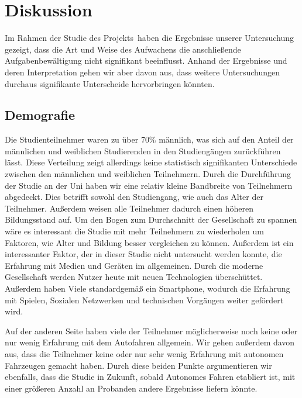 \chapter{Diskussion}

Im Rahmen der Studie des Projekts \projectName \,haben die Ergebnisse unserer Untersuchung gezeigt, dass die Art und Weise des Aufwachens die anschließende Aufgabenbewältigung nicht signifikant beeinflusst.
Anhand der Ergebnisse und deren Interpretation gehen wir aber davon aus, dass weitere Untersuchungen durchaus signifikante Unterscheide hervorbringen könnten.

\section{Demografie}

Die Studienteilnehmer waren zu über 70\% männlich, was sich auf den Anteil der männlichen und weiblichen Studierenden in den Studiengängen zurückführen lässt. Diese Verteilung zeigt allerdings keine statistisch signifikanten Unterschiede zwischen den männlichen und weiblichen Teilnehmern.
Durch die Durchführung der Studie an der Uni haben wir eine relativ kleine Bandbreite von Teilnehmern abgedeckt. Dies betrifft sowohl den Studiengang, wie auch das Alter der Teilnehmer. Außerdem weisen alle Teilnehmer dadurch einen höheren Bildungsstand auf. 
Um den Bogen zum Durchschnitt der Gesellschaft zu spannen wäre es interessant die Studie mit mehr Teilnehmern zu wiederholen um Faktoren, wie Alter und Bildung besser vergleichen zu können.
Außerdem ist ein interessanter Faktor, der in dieser Studie nicht untersucht werden konnte, die Erfahrung mit Medien und Geräten im allgemeinen. 
Durch die moderne Gesellschaft werden Nutzer heute mit neuen Technologien überschüttet. Außerdem haben Viele standardgemäß ein Smartphone, wodurch die Erfahrung mit Spielen, Sozialen Netzwerken und technischen Vorgängen weiter gefördert wird.

Auf der anderen Seite haben viele der Teilnehmer möglicherweise noch keine oder nur wenig Erfahrung mit dem Autofahren allgemein. Wir gehen außerdem davon aus, dass die Teilnehmer keine oder nur sehr wenig Erfahrung mit autonomen Fahrzeugen gemacht haben. Durch diese beiden Punkte argumentieren wir ebenfalls, dass die Studie in Zukunft, sobald Autonomes Fahren etabliert ist, mit einer größeren Anzahl an Probanden andere Ergebnisse liefern könnte. 

